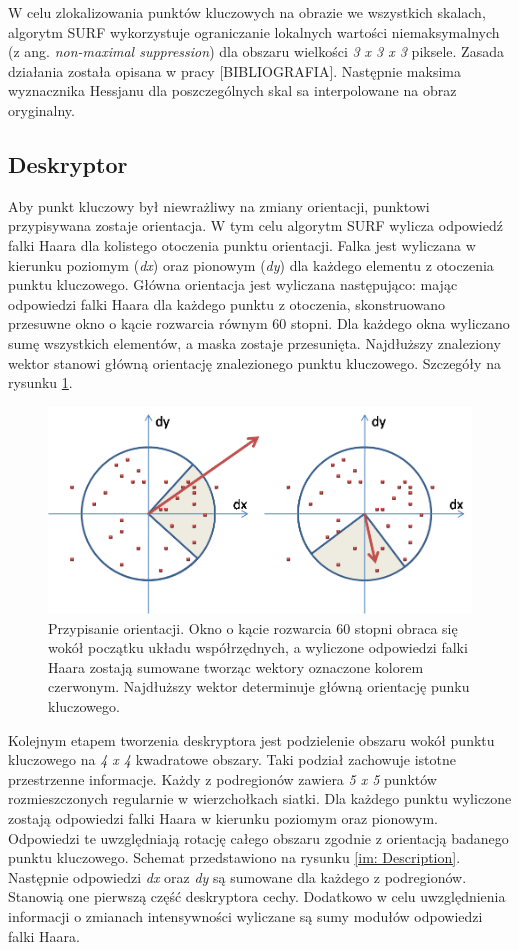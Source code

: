 W celu zlokalizowania punktów kluczowych na obrazie we wszystkich skalach, algorytm SURF wykorzystuje ograniczanie lokalnych wartości niemaksymalnych (z ang. \textit{non-maximal suppression}) dla obszaru wielkości \textit{3 x 3 x 3} piksele. Zasada działania została opisana w pracy [BIBLIOGRAFIA]. Następnie maksima wyznacznika Hessjanu dla poszczególnych skal sa interpolowane na obraz oryginalny.

\subsection{Deskryptor} 
Aby punkt kluczowy był niewrażliwy na zmiany orientacji, punktowi przypisywana zostaje orientacja. W tym celu algorytm SURF wylicza odpowiedź falki Haara dla kolistego otoczenia punktu orientacji. Falka jest wyliczana w kierunku poziomym (\textit{dx}) oraz pionowym (\textit{dy}) dla każdego elementu z otoczenia punktu kluczowego.
Główna orientacja jest wyliczana następująco: mając odpowiedzi falki Haara dla każdego punktu z otoczenia, skonstruowano przesuwne okno o kącie rozwarcia równym 60 stopni. Dla każdego okna wyliczano sumę wszystkich elementów, a maska zostaje przesunięta. Najdłuższy znaleziony wektor stanowi główną orientację znalezionego punktu kluczowego. Szczegóły na rysunku \ref{im: SurfOrientationTwo}.

 \begin{figure}[h]
	\includegraphics[width=12cm]{SurfOrientationTwo}
	\centering
	\caption{Przypisanie orientacji. Okno o kącie rozwarcia 60 stopni obraca się wokół początku układu współrzędnych, a wyliczone odpowiedzi falki Haara zostają sumowane tworząc wektory oznaczone kolorem czerwonym. Najdłuższy wektor determinuje główną orientację punku kluczowego.}
	\label{im: SurfOrientationTwo}
\end{figure}

Kolejnym etapem tworzenia deskryptora jest podzielenie obszaru wokół punktu kluczowego na  \textit{4 x 4} kwadratowe obszary. Taki podział zachowuje istotne przestrzenne informacje. Każdy z podregionów zawiera \textit{5 x 5} punktów rozmieszczonych regularnie w wierzchołkach siatki. Dla każdego punktu wyliczone zostają odpowiedzi falki Haara w kierunku poziomym oraz pionowym. Odpowiedzi te uwzględniają rotację całego obszaru zgodnie z orientacją badanego punktu kluczowego. Schemat przedstawiono na rysunku \ref{im: Description}. Następnie odpowiedzi \textit{dx} oraz \textit{dy} są sumowane dla każdego z podregionów. Stanowią one pierwszą część deskryptora cechy. Dodatkowo w celu uwzględnienia informacji o zmianach intensywności wyliczane są sumy modułów odpowiedzi falki Haara. 

